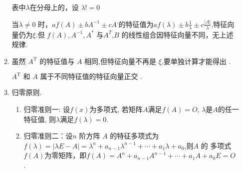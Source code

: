 \begin{enumerate}
\begin{enumerate}
                    表中$\lambda$在分母上的，设 $\lambda != 0$
                    \begin{note}{}{}
                        当$\lambda\neq0$ 时，$af(A)\pm bA^{-1}\pm cA^{.}$的特征值为$af\left(\lambda\right)\pm b\frac1\lambda\pm c\frac{|A|}\lambda$,特征向量仍为$\xi$.但
                        $f(A),A^{-1},A^*$ 与$A^T$,$B$ 的线性组合因特征向量不同，无上述规律.
                    \end{note}
              \item $\text{虽然 }A^\mathrm{T}\text{ 的特征值与 }A\text{ 相同,但特征向量不再是 }\xi\text{,要单独计算才能得出 }.$
                    \begin{note}{}{}
                        $ A^\mathrm{T}\text{ 和 }A\text{ 属于不同特征值的特征向量正交 }.$
                    \end{note}
              \item 归零原则.
                    \begin{enumerate}
                        \item 归零准则一: 设$f(x)$为多项式, 若矩阵$A$满足$f(A)=O$, $\lambda$是$A$的任一特征值, 则$\lambda$满足$f(\lambda)=0$.
                        \item 归零准则二：设$n$ 阶方阵 $A$ 的特征多项式为$f(\lambda)=|\lambda E-A|=\lambda^n+a_{n-1}\lambda^{n-1}+\cdots+a_1\lambda+a_0$,则$A$ 的
                              多项式$f(A)$为零矩阵，即$f( A) = A^{n }+ a_{n- 1}A^{n- 1}+ \cdots + a_{1}A+ a_{0}E= O$ .
                    \end{enumerate}
          \end{enumerate}
\end{enumerate}

